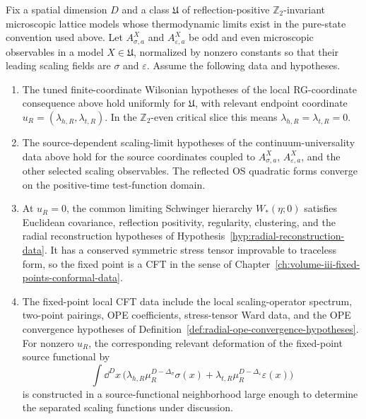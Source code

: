 \begin{hypothesis}
\label{hyp:conditional-ising-universality-lattice-to-cft-data}
Fix a spatial dimension \(D\) and a class \(\mathfrak U\) of
reflection-positive \(\mathbb Z_2\)-invariant microscopic lattice models whose
thermodynamic limits exist in the pure-state convention used above.  Let
\(A^X_{\sigma,a}\) and \(A^X_{\varepsilon,a}\) be odd and even microscopic
observables in a model \(X\in\mathfrak U\), normalized by nonzero constants
so that their leading scaling fields are \(\sigma\) and \(\varepsilon\).
Assume the following data and hypotheses.
\begin{enumerate}[label=(\roman*)]
  \item The tuned finite-coordinate Wilsonian hypotheses of
  the local RG-coordinate consequence above hold uniformly for
  \(\mathfrak U\), with relevant endpoint coordinate
  \(u_R=(\lambda_{h,R},\lambda_{t,R})\).  In the \(\mathbb Z_2\)-even critical
  slice this means \(\lambda_{h,R}=\lambda_{t,R}=0\).
  \item The source-dependent scaling-limit hypotheses of
  the continuum-universality data above hold for the
  source coordinates coupled to \(A^X_{\sigma,a}\), \(A^X_{\varepsilon,a}\),
  and the other selected scaling observables.  The reflected OS quadratic
  forms converge on the positive-time test-function domain.
  \item At \(u_R=0\), the common limiting Schwinger hierarchy
  \(W_\ast(\eta;0)\) satisfies Euclidean covariance, reflection positivity,
  regularity, clustering, and the radial reconstruction hypotheses of
  Hypothesis~\ref{hyp:radial-reconstruction-data}.  It has a conserved
  symmetric stress tensor improvable to traceless form, so the fixed point is
  a CFT in the sense of
  Chapter~\ref{ch:volume-iii-fixed-points-conformal-data}.
  \item The fixed-point local CFT data include the local scaling-operator
  spectrum, two-point pairings, OPE coefficients, stress-tensor Ward data, and
  the OPE convergence hypotheses of
  Definition~\ref{def:radial-ope-convergence-hypotheses}.  For nonzero
  \(u_R\), the corresponding relevant deformation of the fixed-point source
  functional by
  \[
    \int\dd^Dx\,
    \bigl(
      \lambda_{h,R}\mu_R^{D-\Delta_\sigma}\sigma(x)
      +
      \lambda_{t,R}\mu_R^{D-\Delta_\varepsilon}\varepsilon(x)
    \bigr)
  \]
  is constructed in a source-functional neighborhood large enough to determine
  the separated scaling functions under discussion.
\end{enumerate}
\end{hypothesis}

